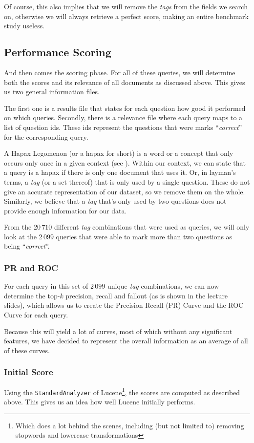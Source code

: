 \documentclass[11pt]{article}
\begin{document}
Of course, this also implies that we will remove the \textit{tags} from the fields we search on, otherwise we will always retrieve a perfect score, making an entire benchmark study useless.

\subsection{Performance Scoring}
And then comes the scoring phase. For all of these queries, we will determine both the scores and its relevance of all documents as discussed above. This gives us two general information files.

The first one is a results file that states for each question how good it performed on which queries. Secondly, there is a relevance file where each query maps to a list of question ids. These ids represent the questions that were marks ``\textit{correct}'' for the corresponding query.

A \textsf{Hapax Legomenon} (or a \textsf{hapax} for short) is a word or a concept that only occurs only once in a given context (see \cite{hapax}). Within our context, we can state that a query is a \textsf{hapax} if there is only one document that uses it. Or, in layman's terms, a \textit{tag} (or a set thereof) that is only used by a single question. These do not give an accurate representation of our dataset, so we remove them on the whole. Similarly, we believe that a \textit{tag} that's only used by two questions does not provide enough information for our data.

From the $20\,710$ different \textit{tag} combinations that were used as queries, we will only look at the $2\,099$ queries that were able to mark more than two questions as being ``\textit{correct}''.

\subsubsection{PR and ROC}
For each query in this set of $2\,099$ unique \textit{tag} combinations, we can now determine the top-$k$ precision, recall and fallout (as is shown in the lecture slides), which allows us to create the Precision-Recall (PR) Curve and the ROC-Curve for each query.

Because this will yield a lot of curves, most of which without any significant features, we have decided to represent the overall information as an average of all of these curves.

\subsubsection{Initial Score}
Using the \texttt{StandardAnalyzer} of Lucene\footnote{Which does a lot behind the scenes, including (but not limited to) removing stopwords and lowercase transformations}, the scores are computed as described above. This gives us an idea how well Lucene initially performs.
\end{document}
